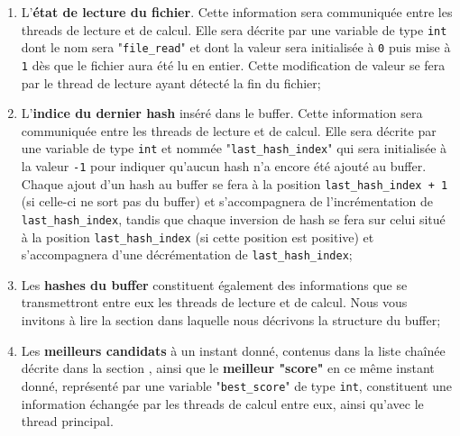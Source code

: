 \documentclass{article}
\begin{document}
	\begin{enumerate}
		\item
		L'\textbf{état de lecture du fichier}.
		Cette information sera communiquée entre les threads de lecture et de calcul.
		Elle sera décrite par une variable de type \lstinline{int} dont le nom sera "\lstinline{file_read}" et dont la valeur sera initialisée à \lstinline{0} puis mise à \lstinline{1} dès que le fichier aura été lu en entier.
		Cette modification de valeur se fera par le thread de lecture ayant détecté la fin du fichier;
		
		\item
		L'\textbf{indice du dernier hash} inséré dans le buffer.
		Cette information sera communiquée entre les threads de lecture et de calcul.
		Elle sera décrite par une variable de type \lstinline{int} et nommée "\lstinline{last_hash_index}" qui sera initialisée à la valeur \lstinline{-1} pour indiquer qu'aucun hash n'a encore été ajouté au buffer.
		Chaque ajout d'un hash au buffer se fera à la position \lstinline{last_hash_index + 1} (si celle-ci ne sort pas du buffer) et s'accompagnera de l'incrémentation de \lstinline{last_hash_index}, tandis que chaque inversion de hash se fera sur celui situé à la position \lstinline{last_hash_index} (si cette position est positive) et s'accompagnera d'une décrémentation de \lstinline{last_hash_index};
		
		\item 
		Les \textbf{hashes du buffer} constituent également des informations que se transmettront entre eux les threads de lecture et de calcul. Nous vous invitons à lire la section \textit{} dans laquelle nous décrivons la structure du buffer;
		
		\item
		Les \textbf{meilleurs candidats} à un instant donné, contenus dans la liste chaînée décrite dans la section \textit{}, ainsi que le \textbf{meilleur "score"} en ce même instant donné, représenté par une variable "\lstinline{best_score}" de type \lstinline{int}, constituent une information échangée par les threads de calcul entre eux, ainsi qu'avec le thread principal.
		
	\end{enumerate}
\end{document}
